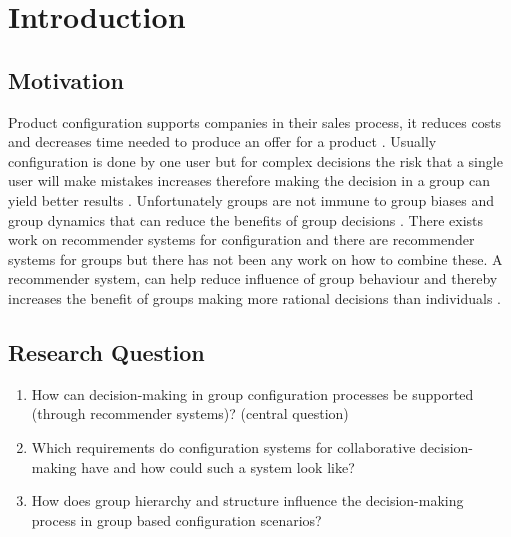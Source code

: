 \chapter{Introduction}
\label{ch:Introduction}

\section{Motivation}
\label{sec:Introduction:Motivation}

Product configuration supports companies in their sales process, it reduces costs and decreases time needed to produce an offer for a product \cite{shafieeCostBenefitAnalysis2018}. Usually configuration is done by one user but for complex decisions the risk that a single user will make mistakes increases therefore making the decision in a group can yield better results \cite{felferningGroupBasedConfiguration2016, felfernigGroupDecisionSupport2011}. Unfortunately groups are not immune to group biases and group dynamics that can reduce the benefits of group decisions \cite{kerrBiasJudgmentComparing1996}.
There exists work on recommender systems for configuration and there are recommender systems for groups but there has not been any work on how to combine these. A recommender system, can help reduce influence of group behaviour and thereby increases the benefit of groups making more rational decisions than individuals \cite{charnessGroupsMakeBetter2012}.

\section{Research Question}
\label{sec:Introduction:ResearchQuestion}
\begin{enumerate}
    \item How can decision-making in group configuration processes be supported (through recommender systems)? (central question)
    \item Which requirements do configuration systems for collaborative decision-making have and how could such a system look like?
    \item How does group hierarchy and structure influence the decision-making process in group based configuration scenarios?
\end{enumerate}
